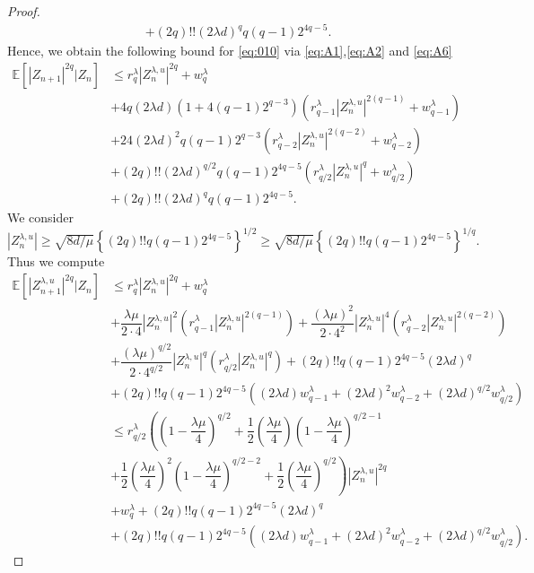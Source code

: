 \documentclass[10pt,a4paper]{amsart}
\begin{document}
\begin{proof}
\begin{align}
&+(2q)!!(2\lambda d)^qq(q-1)2^{4q-5}.\label{eq:A6}
\end{align}
Hence, we obtain the following bound for \eqref{eq:010} via \eqref{eq:A1},\eqref{eq:A2} and \eqref{eq:A6}
\begin{align}
\mathbb{E}\left[|Z_{n+1}|^{2q}|Z_n\right]&\leq r_q^{\lambda}|Z_n^{\lambda,u}|^{2q}+w_q^{\lambda}\nonumber\\
&+4q\left(2\lambda d\right)(1+4(q-1)2^{q-3}) \left(r_{q-1}^{\lambda}|Z_n^{\lambda,u}|^{2(q-1)}+w_{q-1}^{\lambda}\right)\nonumber\\
&+24(2\lambda d)^2q(q-1)2^{q-3} \left(r_{q-2}^{\lambda}|Z_n^{\lambda,u}|^{2(q-2)}+w_{q-2}^{\lambda}\right)\nonumber\\
&+(2q)!!(2\lambda d)^{q/2}q(q-1)2^{4q-5}\left(r^{\lambda}_{q/2}|Z_n^{\lambda,u}|^q+w^{\lambda}_{q/2}\right)\nonumber\\
&+(2q)!!(2\lambda d)^qq(q-1)2^{4q-5}.\label{eq:A7}
\end{align}
We consider $|Z_n^{\lambda,u}|\geq \sqrt{8d/\mu}\left\{(2q)!!q(q-1)2^{4q-5}\right\}^{1/2}\geq \sqrt{8d/\mu}\left\{(2q)!!q(q-1)2^{4q-5}\right\}^{1/q}.$ Thus we compute
\begin{align*}
\mathbb{E}\left[|Z_{n+1}^{\lambda,u}|^{2q}|Z_n\right]&\leq r_q^{\lambda}|Z_n^{\lambda,u}|^{2q}+w_q^{\lambda}\\
&+\dfrac{\lambda\mu}{2\cdot 4}|Z_n^{\lambda,u}|^2\left(r_{q-1}^{\lambda}|Z_n^{\lambda,u}|^{2(q-1)}\right)+\dfrac{(\lambda\mu)^2}{2\cdot 4^2}|Z_n^{\lambda,u}|^4\left(r_{q-2}^{\lambda}|Z_n^{\lambda,u}|^{2(q-2)}\right)\\&+\dfrac{(\lambda\mu)^{q/2}}{2\cdot 4^{q/2}}|Z_n^{\lambda,u}|^{q}\left(r^{\lambda}_{q/2}|Z_n^{\lambda,u}|^q\right)+(2q)!!q(q-1)2^{4q-5}(2\lambda d)^q\\&+(2q)!!q(q-1)2^{4q-5}\left((2\lambda d)w_{q-1}^{\lambda}+(2\lambda d)^2w_{q-2}^{\lambda}+(2\lambda d)^{q/2}w_{q/2}^{\lambda}\right)\\
&\leq r^{\lambda}_{q/2}\left(\left(1-\dfrac{\lambda\mu}{4}\right)^{q/2}+\dfrac{1}{2}\left(\dfrac{\lambda\mu}{4}\right)\left(1-\dfrac{\lambda\mu}{4}\right)^{q/2-1}\right.\\
&\left.+\dfrac{1}{2}\left(\dfrac{\lambda\mu}{4}\right)^{2}\left(1-\dfrac{\lambda\mu}{4}\right)^{q/2-2}+\dfrac{1}{2}\left(\dfrac{\lambda\mu}{4}\right)^{q/2}\right)|Z_n^{\lambda,u}|^{2q}\\
&+w_q^{\lambda}+(2q)!!q(q-1)2^{4q-5}(2\lambda d)^q\\
&+(2q)!!q(q-1)2^{4q-5}\left((2\lambda d)w_{q-1}^{\lambda}+(2\lambda d)^2w_{q-2}^{\lambda}+(2\lambda d)^{q/2}w_{q/2}^{\lambda}\right).

\end{align*}
\end{proof}
\end{document}
